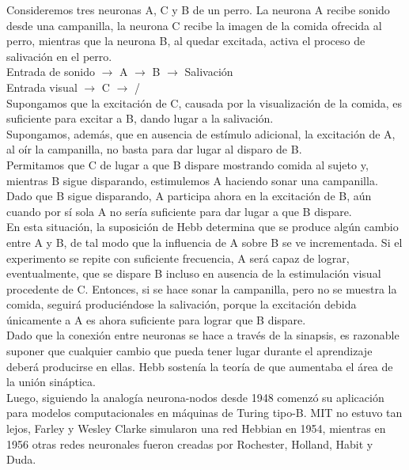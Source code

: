 \documentclass{llncs}
\begin{document}
\begin{multicols}{2}[]
Consideremos tres neuronas A, C y B de un perro. La neurona A recibe sonido desde una campanilla, la neurona C recibe la
imagen de la comida ofrecida al perro, mientras que la neurona B, al quedar excitada, activa el proceso de salivaci\'on en el perro.\\

Entrada de sonido $\rightarrow$ A $\rightarrow$ B $\rightarrow$ Salivaci\'on\\

Entrada visual $\rightarrow$ C $\rightarrow$  /\\

Supongamos que la excitaci\'on de C, causada por la visualizaci\'on de la comida, es suficiente para excitar a B, dando lugar a la 
salivaci\'on. \\

Supongamos, adem\'as, que en ausencia de est\'imulo adicional, la excitaci\'on de A, al o\'ir la campanilla, no basta para dar lugar al
disparo de B.\\

Permitamos que C de lugar a que B dispare mostrando comida al sujeto y, mientras B sigue disparando, estimulemos A haciendo
sonar una campanilla. Dado que B sigue disparando, A participa ahora en la excitaci\'on de B, a\'un cuando por s\'i sola A no ser\'ia
suficiente para dar lugar a que B dispare.\\

En esta situaci\'on, la suposici\'on de Hebb determina que se produce alg\'un cambio entre A y B, de tal modo que la influencia de A
sobre B se ve incrementada. Si el experimento se repite con suficiente frecuencia, A ser\'a capaz de lograr, eventualmente, que se
dispare B incluso en ausencia de la estimulaci\'on visual procedente de C. Entonces, si se hace sonar la campanilla, pero no se muestra
la comida, seguir\'a produci\'endose la salivaci\'on, porque la excitaci\'on debida \'unicamente a A es ahora suficiente para lograr que
B dispare.\\

Dado que la conexi\'on entre neuronas se hace a trav\'es de la sinapsis, es razonable suponer que cualquier cambio que pueda tener
lugar durante el aprendizaje deber\'a producirse en ellas. Hebb sosten\'ia la teor\'ia de que aumentaba el \'area de la uni\'on sin\'aptica.\\

Luego, siguiendo la analog\'ia neurona-nodos desde 1948 comenz\'o su aplicaci\'on para modelos
computacionales en m\'aquinas de Turing tipo-B. MIT no estuvo tan lejos, Farley y Wesley Clarke simularon una red Hebbian en 1954,
mientras en 1956 otras redes neuronales fueron creadas por Rochester, Holland, Habit y Duda. \\


\end{multicols}
\end{document}
